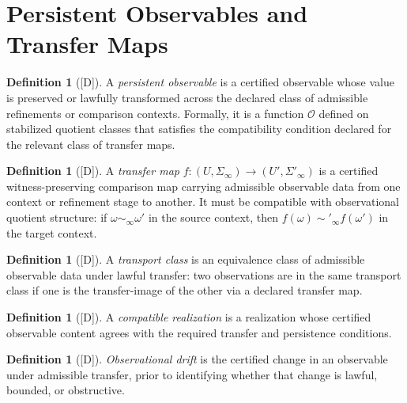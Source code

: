 \documentclass[12pt,oneside]{amsbook}
\theoremstyle{plain}
\theoremstyle{definition}
\newtheorem{definition}[theorem]{Definition}
\theoremstyle{remark}
\newcommand{\status}[1]{\textup{[#1]}}
\begin{document}
\section{Persistent Observables and Transfer Maps}

\begin{definition}[\status{D}]\label{def:persistent-obs}
A \emph{persistent observable} is a certified observable whose value
is preserved or lawfully transformed across the declared class of
admissible refinements or comparison contexts.  Formally, it is a
function $\mathcal{O}$ defined on stabilized quotient classes that
satisfies the compatibility condition declared for the relevant class
of transfer maps.
\end{definition}

\begin{definition}[\status{D}]\label{def:transfer-map}
A \emph{transfer map} $f: (U, \Sigma_\infty) \to (U', \Sigma'_\infty)$
is a certified witness-preserving comparison map carrying admissible
observable data from one context or refinement stage to another.  It
must be compatible with observational quotient structure: if $\omega
\sim_\infty \omega'$ in the source context, then $f(\omega)
\sim'_\infty f(\omega')$ in the target context.
\end{definition}

\begin{definition}[\status{D}]\label{def:transport-class}
A \emph{transport class} is an equivalence class of admissible
observable data under lawful transfer: two observations are in the
same transport class if one is the transfer-image of the other via a
declared transfer map.
\end{definition}

\begin{definition}[\status{D}]\label{def:compatible-realization}
A \emph{compatible realization} is a realization whose certified
observable content agrees with the required transfer and persistence
conditions.
\end{definition}

\begin{definition}[\status{D}]\label{def:obs-drift}
\emph{Observational drift} is the certified change in an observable
under admissible transfer, prior to identifying whether that change is
lawful, bounded, or obstructive.
\end{definition}
\end{document}
